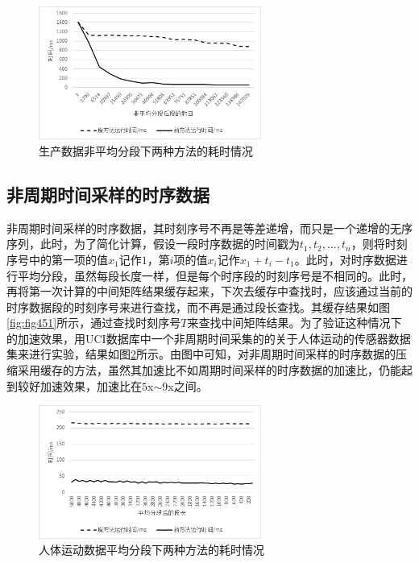 \begin{figure}[htb]
	\centering
	\includegraphics[width=0.65\textwidth]{figures/figure4x3}
	\caption{生产数据非平均分段下两种方法的耗时情况}\label{fig:fig43}
\end{figure}

\subsection{非周期时间采样的时序数据}
非周期时间采样的时序数据，其时刻序号不再是等差递增，而只是一个递增的无序序列，此时，为了简化计算，假设一段时序数据的时间戳为$t_1,t_2,...,t_n$，则将时刻序号中的第一项的值$x_1$记作$1$，第$i$项的值$x_i$记作$x_1 + t_i-t_1$。此时，对时序数据进行平均分段，虽然每段长度一样，但是每个时序段的时刻序号是不相同的。此时，再将第一次计算的中间矩阵结果缓存起来，下次去缓存中查找时，应该通过当前的时序数据段的时刻序号来进行查找，而不再是通过段长查找。其缓存结果如图\ref{fig:fig451}所示，通过查找时刻序号$T$来查找中间矩阵结果。为了验证这种情况下的加速效果，用UCI数据库中一个非周期时间采集的的关于人体运动的传感器数据集来进行实验，结果如图\ref{fig:fig44}所示。由图中可知，对非周期时间采样的时序数据的压缩采用缓存的方法，虽然其加速比不如周期时间采样的时序数据的加速比，仍能起到较好加速效果，加速比在$5$x$\sim 9$x之间。

\begin{figure}[htb]
	\centering
	\includegraphics[width=0.65\textwidth]{figures/figure4x4}
	\caption{人体运动数据平均分段下两种方法的耗时情况}\label{fig:fig44}
\end{figure}

